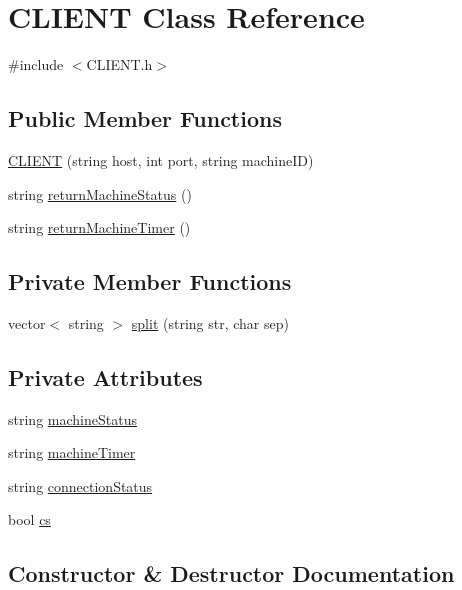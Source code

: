 \hypertarget{classCLIENT}{}\section{C\+L\+I\+E\+N\+T Class Reference}
\label{classCLIENT}


{\ttfamily \#include $<$C\+L\+I\+E\+N\+T.\+h$>$}

\subsection*{Public Member Functions}
\begin{DoxyCompactItemize}
\item 
\hyperlink{classCLIENT_a75ee0d6f5c06f2fe955ce3521ae7c006}{C\+L\+I\+E\+N\+T} (string host, int port, string machine\+I\+D)
\item 
string \hyperlink{classCLIENT_a7dae67de8282043e85a51a6fce71d304}{return\+Machine\+Status} ()
\item 
string \hyperlink{classCLIENT_a4ca44e781e85e795af54eca1adc7432a}{return\+Machine\+Timer} ()
\end{DoxyCompactItemize}
\subsection*{Private Member Functions}
\begin{DoxyCompactItemize}
\item 
vector$<$ string $>$ \hyperlink{classCLIENT_a007cf416382fd529a3456f9c5db5771f}{split} (string str, char sep)
\end{DoxyCompactItemize}
\subsection*{Private Attributes}
\begin{DoxyCompactItemize}
\item 
string \hyperlink{classCLIENT_a83578b8ade6203c7a78972b3393e923b}{machine\+Status}
\item 
string \hyperlink{classCLIENT_a0474dbf26b3f3a99bf7579278453ef79}{machine\+Timer}
\item 
string \hyperlink{classCLIENT_a750c6b410d6358c35e415031dfd350c8}{connection\+Status}
\item 
bool \hyperlink{classCLIENT_af7973e9a611e41850653f69b9e9e3e8f}{cs}
\end{DoxyCompactItemize}


\subsection{Constructor \& Destructor Documentation}
\hypertarget{classCLIENT_a75ee0d6f5c06f2fe955ce3521ae7c006}{}
